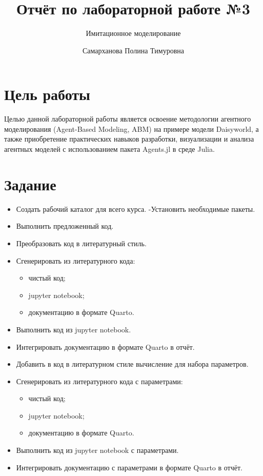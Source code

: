 \documentclass[
  english,
  russian,
  12pt,
  a4paper,
  DIV=11,
  numbers=noendperiod]{scrreprt}
\title{Отчёт по лабораторной работе №3}
\subtitle{Имитационное моделирование}
\author{Самарханова Полина Тимуровна}
\date{}
\providecommand{\tightlist}{%
  \setlength{\itemsep}{0pt}\setlength{\parskip}{0pt}}
\renewcommand*\contentsname{Содержание}
\newcommand\contentsname{Содержание}
\begin{document}
\maketitle

\renewcommand*\contentsname{Содержание}
{
\setcounter{tocdepth}{1}
\tableofcontents
}
\listoffigures
\listoftables

\chapter{Цель
работы}\label{ux446ux435ux43bux44c-ux440ux430ux431ux43eux442ux44b}

Целью данной лабораторной работы является освоение методологии агентного
моделирования (Agent-Based Modeling, ABM) на примере модели Daisyworld,
а также приобретение практических навыков разработки, визуализации и
анализа агентных моделей с использованием пакета Agents.jl в среде
Julia.

\chapter{Задание}\label{ux437ux430ux434ux430ux43dux438ux435}

\begin{itemize}
\tightlist
\item
  Создать рабочий каталог для всего курса. -Установить необходимые
  пакеты.
\item
  Выполнить предложенный код.
\item
  Преобразовать код в литературный стиль.
\item
  Сгенерировать из литературного кода:

  \begin{itemize}
  \tightlist
  \item
    чистый код;
  \item
    jupyter notebook;
  \item
    документацию в формате Quarto.
  \end{itemize}
\item
  Выполнить код из jupyter notebook.
\item
  Интегрировать документацию в формате Quarto в отчёт.
\item
  Добавить в код в литературном стиле вычисление для набора параметров.
\item
  Сгенерировать из литературного кода с параметрами:

  \begin{itemize}
  \tightlist
  \item
    чистый код;
  \item
    jupyter notebook;
  \item
    документацию в формате Quarto.
  \end{itemize}
\item
  Выполнить код из jupyter notebook с параметрами.
\item
  Интегрировать документацию с параметрами в формате Quarto в отчёт.
\end{itemize}
\end{document}
